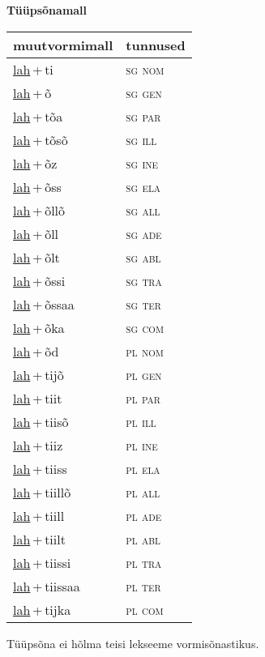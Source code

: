 
\vspace{1.8em}
\begin{minipage}{\textwidth}
\textbf{Tüüpsõnamall \,}\\

\begin{sideways}
\begin{tabular}{l l}
muutvormimall & tunnused \\
\hline
\underline{lah}\,+\,ti & \textsc{ sg nom } \\
\underline{lah}\,+\,õ & \textsc{ sg gen } \\
\underline{lah}\,+\,tõa & \textsc{ sg par } \\
\underline{lah}\,+\,tõsõ & \textsc{ sg ill } \\
\underline{lah}\,+\,õz & \textsc{ sg ine } \\
\underline{lah}\,+\,õss & \textsc{ sg ela } \\
\underline{lah}\,+\,õllõ & \textsc{ sg all } \\
\underline{lah}\,+\,õll & \textsc{ sg ade } \\
\underline{lah}\,+\,õlt & \textsc{ sg abl } \\
\underline{lah}\,+\,õssi & \textsc{ sg tra } \\
\underline{lah}\,+\,õssaa & \textsc{ sg ter } \\
\underline{lah}\,+\,õka & \textsc{ sg com } \\
\underline{lah}\,+\,õd & \textsc{ pl nom } \\
\underline{lah}\,+\,tijõ & \textsc{ pl gen } \\
\underline{lah}\,+\,tiit & \textsc{ pl par } \\
\underline{lah}\,+\,tiisõ & \textsc{ pl ill } \\
\underline{lah}\,+\,tiiz & \textsc{ pl ine } \\
\underline{lah}\,+\,tiiss & \textsc{ pl ela } \\
\underline{lah}\,+\,tiillõ & \textsc{ pl all } \\
\underline{lah}\,+\,tiill & \textsc{ pl ade } \\
\underline{lah}\,+\,tiilt & \textsc{ pl abl } \\
\underline{lah}\,+\,tiissi & \textsc{ pl tra } \\
\underline{lah}\,+\,tiissaa & \textsc{ pl ter } \\
\underline{lah}\,+\,tijka & \textsc{ pl com } \\
\end{tabular}
\end{sideways}
\label{tab:tüüpsõnamall-lahti}

\end{minipage}

 
\vspace{1em}
\noindent Tüüpsõna ei hõlma teisi lekseeme vormi\-sõnastikus.
